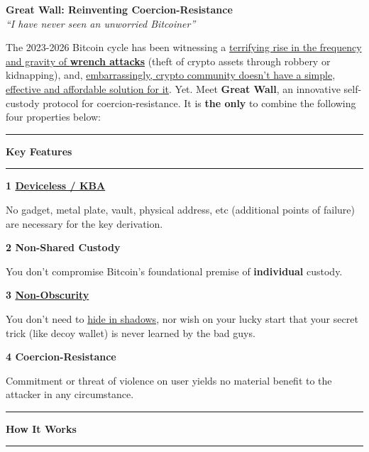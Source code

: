 \documentclass[8pt]{article}
\newcommand{\obsegg}{https://www.linkedin.com/posts/lugano-plan-b_luganoplanb-bitcoin-activity-7167881837728493568-LEZk/}
\newcommand{\theproblem}{https://x.com/search?q=jameson\%20lopp\%20wrench\%20attack&src=typed_query&f=live}
\newcommand{\nocurrentsolution}{https://www.youtube.com/watch?v=MsfR6ZIkzPs&t=2734s}
\newcommand{\kba}{https://en.wikipedia.org/wiki/Knowledge-based_authentication}
\newcommand{\kprinciple}{https://en.wikipedia.org/wiki/Kerckhoffs's_principle}
\newcommand{\feature}[2]{
    \noindent\textbf{\large #1}\par
    \vspace{2pt}
    #2
    \vspace{11pt}
}
\begin{document}
\pagestyle{empty}  %
\begin{center}
    \vspace*{-1cm}
    {\huge\bfseries\color{accent} Great Wall: Reinventing Coercion-Resistance}\\[1ex]
    {\large\textit{``I have never seen an unworried Bitcoiner''}}
    \vspace{0.2cm}
\end{center}

\noindent
The 2023-2026 Bitcoin cycle has been witnessing a \href{\theproblem}{terrifying rise in the frequency and gravity of \textbf{wrench attacks}} (theft of crypto assets through robbery or kidnapping), and, \href{\nocurrentsolution}{embarrassingly, crypto community doesn't have a simple, effective and affordable solution for it}. Yet. Meet \textbf{Great Wall}, an innovative self-custody protocol for coercion-resistance. It is \textbf{the only} to combine the following four properties below: 

\vspace{0.2cm}

{\color{accent}\hrule}
\vspace{0.2cm}
{\Large\textbf{Key Features}}
\vspace{0.2cm}
{\color{accent}\hrule}
\vspace{0.2cm}

\begin{multicols}{2}
    \feature{1 \href{\kba}{Deviceless / KBA}}{
        No gadget, metal plate, vault, physical address, etc (additional points of failure) are necessary for the key derivation. 
    }

    \feature{2 Non-Shared Custody}{
        You don't compromise Bitcoin's foundational premise of \textbf{individual} custody.
    }

    \feature{3 \href{\kprinciple}{Non-Obscurity}}{
        You don't need to \href{\obsegg}{hide in shadows}, nor wish on your lucky start that your secret trick (like decoy wallet) is never learned by the bad guys.
    }

    \feature{4 Coercion-Resistance}{
        Commitment or threat of violence on user yields no material benefit to the attacker in any circumstance.
    }
\end{multicols}


{\color{accent}\hrule}
\vspace{0.2cm}
{\Large\textbf{How It Works}}
\vspace{0.2cm}
{\color{accent}\hrule}
\vspace{0.3cm}
\end{document}
